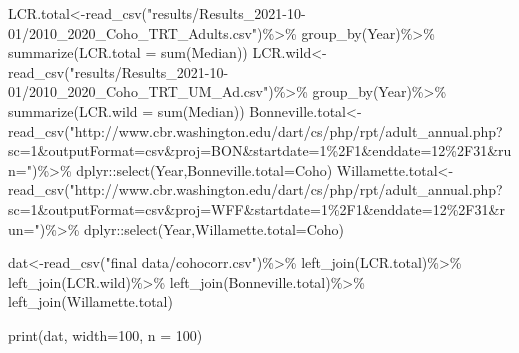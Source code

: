 \documentclass[
]{article}
\newenvironment{Shaded}{\begin{snugshade}}{\end{snugshade}}
\newcommand{\AttributeTok}[1]{\textcolor[rgb]{0.77,0.63,0.00}{#1}}
\newcommand{\DecValTok}[1]{\textcolor[rgb]{0.00,0.00,0.81}{#1}}
\newcommand{\FunctionTok}[1]{\textcolor[rgb]{0.00,0.00,0.00}{#1}}
\newcommand{\NormalTok}[1]{#1}
\newcommand{\OtherTok}[1]{\textcolor[rgb]{0.56,0.35,0.01}{#1}}
\newcommand{\SpecialCharTok}[1]{\textcolor[rgb]{0.00,0.00,0.00}{#1}}
\newcommand{\StringTok}[1]{\textcolor[rgb]{0.31,0.60,0.02}{#1}}
\begin{document}
\begin{Shaded}
\begin{Highlighting}[]
\NormalTok{LCR.total}\OtherTok{\textless{}{-}}\FunctionTok{read\_csv}\NormalTok{(}\StringTok{"results/Results\_2021{-}10{-}01/2010\_2020\_Coho\_TRT\_Adults.csv"}\NormalTok{)}\SpecialCharTok{\%\textgreater{}\%}
  \FunctionTok{group\_by}\NormalTok{(Year)}\SpecialCharTok{\%\textgreater{}\%}
  \FunctionTok{summarize}\NormalTok{(}\AttributeTok{LCR.total =} \FunctionTok{sum}\NormalTok{(Median))}
\NormalTok{LCR.wild}\OtherTok{\textless{}{-}}\FunctionTok{read\_csv}\NormalTok{(}\StringTok{"results/Results\_2021{-}10{-}01/2010\_2020\_Coho\_TRT\_UM\_Ad.csv"}\NormalTok{)}\SpecialCharTok{\%\textgreater{}\%}
  \FunctionTok{group\_by}\NormalTok{(Year)}\SpecialCharTok{\%\textgreater{}\%}
  \FunctionTok{summarize}\NormalTok{(}\AttributeTok{LCR.wild =} \FunctionTok{sum}\NormalTok{(Median))}
\NormalTok{Bonneville.total}\OtherTok{\textless{}{-}}\FunctionTok{read\_csv}\NormalTok{(}\StringTok{"http://www.cbr.washington.edu/dart/cs/php/rpt/adult\_annual.php?sc=1\&outputFormat=csv\&proj=BON\&startdate=1\%2F1\&enddate=12\%2F31\&run="}\NormalTok{)}\SpecialCharTok{\%\textgreater{}\%}
\NormalTok{  dplyr}\SpecialCharTok{::}\FunctionTok{select}\NormalTok{(Year,}\AttributeTok{Bonneville.total=}\NormalTok{Coho)}
\NormalTok{Willamette.total}\OtherTok{\textless{}{-}}\FunctionTok{read\_csv}\NormalTok{(}\StringTok{"http://www.cbr.washington.edu/dart/cs/php/rpt/adult\_annual.php?sc=1\&outputFormat=csv\&proj=WFF\&startdate=1\%2F1\&enddate=12\%2F31\&run="}\NormalTok{)}\SpecialCharTok{\%\textgreater{}\%}
\NormalTok{  dplyr}\SpecialCharTok{::}\FunctionTok{select}\NormalTok{(Year,}\AttributeTok{Willamette.total=}\NormalTok{Coho)}

\NormalTok{dat}\OtherTok{\textless{}{-}}\FunctionTok{read\_csv}\NormalTok{(}\StringTok{"final data/cohocorr.csv"}\NormalTok{)}\SpecialCharTok{\%\textgreater{}\%}
  \FunctionTok{left\_join}\NormalTok{(LCR.total)}\SpecialCharTok{\%\textgreater{}\%}
  \FunctionTok{left\_join}\NormalTok{(LCR.wild)}\SpecialCharTok{\%\textgreater{}\%}
  \FunctionTok{left\_join}\NormalTok{(Bonneville.total)}\SpecialCharTok{\%\textgreater{}\%}
  \FunctionTok{left\_join}\NormalTok{(Willamette.total)}

\FunctionTok{print}\NormalTok{(dat, }\AttributeTok{width=}\DecValTok{100}\NormalTok{, }\AttributeTok{n =} \DecValTok{100}\NormalTok{)}
\end{Highlighting}
\end{Shaded}
\end{document}
